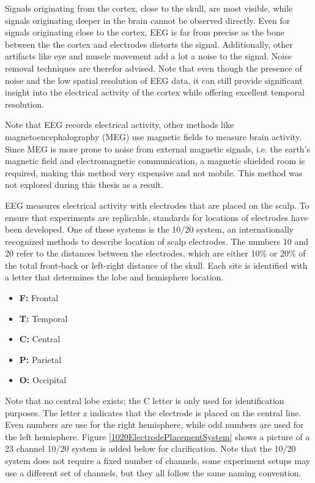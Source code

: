 \npar

Signals originating from the cortex, close to the skull, are most visible, while signals originating deeper in the brain cannot be observed directly. Even for signals originating close to the cortex, EEG is far from precise as the bone between the the cortex and electrodes distorts the signal. Additionally, other artifacts like eye and muscle movement add a lot a noise to the signal. Noise removal techniques are therefor advised. Note that even though the presence of noise and the low spatial resolution of EEG data, it can still provide significant insight into the electrical activity of the cortex while offering excellent temporal resolution\cite{GivenPaper}.

\npar

Note that EEG records electrical activity, other methods like magnetoencephalography (MEG) use magnetic fields to measure brain activity. Since MEG is more prone to noise from external magnetic signals, i.e. the earth's magnetic field and electromagnetic communication, a magnetic shielded room is required, making this method very expensive and not mobile. This method was not explored during this thesis as a result.

\npar

EEG measures electrical activity with electrodes that are placed on the scalp. To ensure that experiments are replicable, standards for locations of electrodes have been developed. One of these systems is the 10/20 system, an internationally recognized methods to describe location of scalp electrodes\cite{TenTwentyManual}. The numbers 10 and 20 refer to the distances between the electrodes, which are either 10\% or 20\% of the total front-back or left-right distance of the skull. Each site is identified with a letter that determines the lobe and hemisphere location.
\begin{itemize}
\item \textbf{F:} Frontal
\item \textbf{T:} Temporal
\item \textbf{C:} Central
\item \textbf{P:} Parietal
\item \textbf{O:} Occipital
\end{itemize}
Note that no central lobe exists; the C letter is only used for identification purposes. The letter z indicates that the electrode is placed on the central line. Even numbers are use for the right hemisphere, while odd numbers are used for the left hemisphere. Figure \ref{1020ElectrodePlacementSystem} shows a picture of a 23 channel 10/20 system is added below for clarification. Note that the 10/20 system does not require a fixed number of channels, some experiment setups may use a different set of channels, but they all follow the same naming convention.

